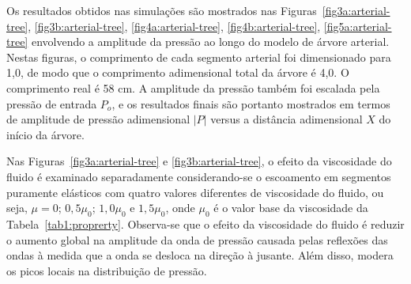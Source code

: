 \documentclass[a4paper,12pt]{monografia}
\theoremstyle{plain}
\theoremstyle{definition}
\theoremstyle{remark}
\begin{document}
Os resultados obtidos nas simulações são mostrados nas Figuras~\ref{fig3a:arterial-tree}, \ref{fig3b:arterial-tree}, \ref{fig4a:arterial-tree}, \ref{fig4b:arterial-tree}, \ref{fig5a:arterial-tree} envolvendo a amplitude da pressão ao longo do modelo de árvore arterial. Nestas figuras, o comprimento de cada segmento arterial foi dimensionado para 1,0, de modo que o comprimento adimensional total da árvore é 4,0. O comprimento real é 58 cm. A amplitude da pressão também foi escalada pela pressão de entrada $P_o$, e os resultados finais são portanto mostrados em termos de amplitude de pressão adimensional $|P|$ versus a distância adimensional $X$ do início da árvore.

Nas Figuras~\ref{fig3a:arterial-tree} e \ref{fig3b:arterial-tree}, o efeito da viscosidade do fluido é examinado separadamente conside\-ran\-do-se o escoamento em segmentos puramente elásticos com quatro valores diferentes de viscosidade do fluido, ou seja, $\mu = 0$; $0,5 \mu_0$; $1,0 \mu_0$ e $1,5 \mu_0$, onde $\mu_0$ é o valor base da viscosidade da Tabela~\ref{tab1:proprerty}. Observa-se que o efeito da viscosidade do fluido é reduzir o aumento global na amplitude da onda de pressão causada pelas reflexões das ondas à medida que a onda se desloca na direção à jusante. Além disso, modera os picos locais na distribuição de pressão.
\end{document}

